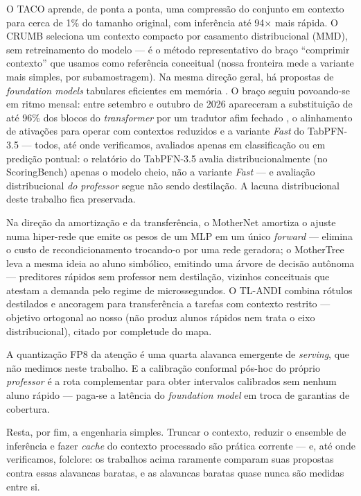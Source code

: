 O TACO \citep{taco2026} aprende, de
ponta a ponta, uma compressão do conjunto em contexto para cerca de 1\% do
tamanho original, com inferência até 94$\times$ mais rápida. O CRUMB
\citep{crumb2026} seleciona um contexto compacto por casamento
distribucional (MMD), sem retreinamento do modelo --- é o método
representativo do braço ``comprimir contexto'' que usamos como referência
conceitual (nossa fronteira mede a variante mais simples, por
subamostragem). Na mesma direção geral, há propostas de \emph{foundation
models} tabulares eficientes em memória \citep{memeff2026}. O braço
seguiu povoando-se em ritmo mensal: entre setembro e outubro de 2026
apareceram a
substituição de até 96\% dos blocos do \emph{transformer} por um
tradutor afim fechado \citep{shallow2026}, o alinhamento de ativações
para operar com contextos reduzidos \citep{actalign2026} e a variante
\emph{Fast} do TabPFN-3.5 \citep{tabpfn35tr2026} --- todos, até onde
verificamos, avaliados apenas em classificação ou em
predição pontual: o relatório do TabPFN-3.5 avalia distribucionalmente
(no ScoringBench) apenas o modelo cheio, não a variante \emph{Fast} ---
e avaliação distribucional \emph{do professor} segue não sendo
destilação. A lacuna distribucional deste trabalho fica preservada.

Na direção da amortização e da transferência, o MotherNet
\citep{mothernet2023} amortiza o ajuste numa hiper-rede que emite os pesos de
um MLP em um único \emph{forward} --- elimina o custo de recondicionamento
trocando-o por uma rede geradora; o MotherTree \citep{mothertree2026}
leva a mesma ideia ao aluno simbólico, emitindo uma árvore de decisão
autônoma --- preditores rápidos sem professor nem destilação, vizinhos
conceituais que atestam a demanda pelo regime de microssegundos. O TL-ANDI \citep{tlandi2026} combina
rótulos destilados e ancoragem para transferência a tarefas com contexto
restrito --- objetivo ortogonal ao nosso (não produz alunos rápidos nem
trata o eixo distribucional), citado por completude do mapa.

A quantização FP8 da atenção
\citep{kubler2026} é uma quarta alavanca emergente de \emph{serving}, que
não medimos neste trabalho. E a calibração conformal pós-hoc do próprio
\emph{professor} \citep{park2026} é a rota complementar para obter intervalos
calibrados sem nenhum aluno rápido --- paga-se a latência do \emph{foundation
model} em troca de garantias de cobertura.

Resta, por fim, a engenharia simples. Truncar o contexto,
reduzir o ensemble de inferência e fazer \emph{cache} do contexto
processado são prática corrente --- e, até onde verificamos, folclore: os
trabalhos acima raramente comparam suas propostas contra essas alavancas
baratas, e as alavancas baratas quase nunca são medidas entre si.

